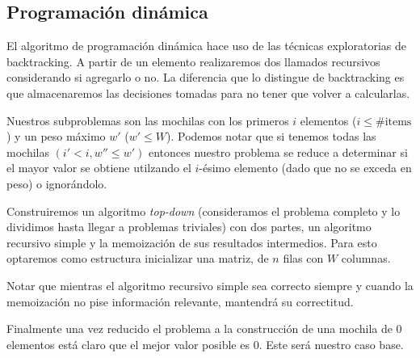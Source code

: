 \documentclass[fleqn, 11pt]{article}
\begin{document}
\subsection{Programación dinámica}

El algoritmo de programación dinámica hace uso de las técnicas exploratorias de
backtracking. A partir de un elemento realizaremos dos llamados recursivos
considerando si agregarlo o no. La diferencia que lo distingue de backtracking
es que almacenaremos las decisiones tomadas para no tener que volver a
calcularlas.

Nuestros subproblemas son las mochilas con los primeros $i$ elementos ($i \le
\#\text{items}$) y un peso máximo $w'$ ($w' \le W$). Podemos notar que si
tenemos todas las mochilas $(i' < i, w'' \le w')$ entonces nuestro problema se
reduce a determinar si el mayor valor se obtiene utilzando el $i$-ésimo
elemento (dado que no se exceda en peso) o ignorándolo.

Construiremos un algoritmo \emph{top-down} (consideramos el problema completo y
lo dividimos hasta llegar a problemas triviales) con dos partes, un algoritmo
recursivo simple y la memoización de sus resultados intermedios. Para esto optaremos como estructura inicializar una matriz, de $n$ filas con $W$ columnas.

Notar que mientras el algoritmo recursivo simple sea correcto siempre y cuando la memoización no pise información relevante, mantendrá su correctitud.

Finalmente una vez reducido el problema a la construcción de una mochila de $0$ elementos
está claro que el mejor valor posible es $0$. Este será nuestro caso base.
\end{document}

